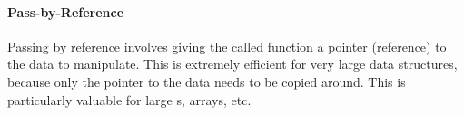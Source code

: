 \paragraph{Pass-by-Reference}\label{par:Pass_by_Reference}
Passing by reference involves giving the called function a pointer (reference) to the data to manipulate.
This is extremely efficient for very large data structures, because only the pointer to the data needs to be copied around.
This is particularly valuable for large s, arrays, etc.

